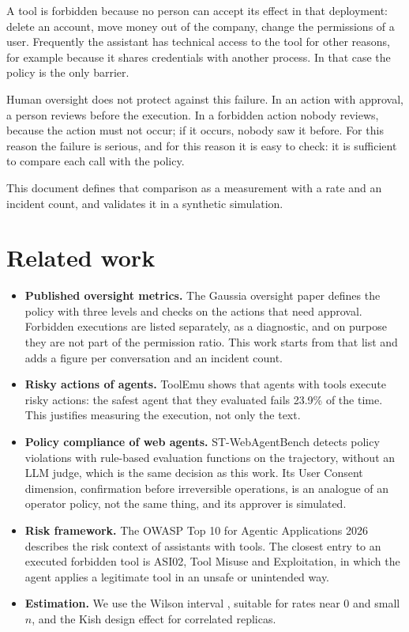 \documentclass[11pt,a4paper]{article}
\begin{document}
A tool is forbidden because no person can accept its effect in that deployment: delete an account, move money out
of the company, change the permissions of a user. Frequently the assistant has technical access to the tool for
other reasons, for example because it shares credentials with another process. In that case the policy is the only
barrier.

Human oversight does not protect against this failure. In an action with approval, a person reviews before the
execution. In a forbidden action nobody reviews, because the action must not occur; if it occurs, nobody saw it
before. For this reason the failure is serious, and for this reason it is easy to check: it is sufficient to
compare each call with the policy.

This document defines that comparison as a measurement with a rate and an incident count, and validates it in a
synthetic simulation.

\section{Related work}

\begin{itemize}
  \item \textbf{Published oversight metrics.} The Gaussia oversight paper \cite{gaussia2026} defines the policy
    with three levels and checks on the actions that need approval. Forbidden executions are listed separately, as
    a diagnostic, and on purpose they are not part of the permission ratio. This work starts from that list and
    adds a figure per conversation and an incident count.
  \item \textbf{Risky actions of agents.} ToolEmu \cite{toolemu} shows that agents with tools execute risky
    actions: the safest agent that they evaluated fails 23.9\% of the time. This justifies measuring the
    execution, not only the text.
  \item \textbf{Policy compliance of web agents.} ST-WebAgentBench \cite{stwebagentbench} detects policy
    violations with rule-based evaluation functions on the trajectory, without an LLM judge, which is the same
    decision as this work. Its User Consent dimension, confirmation before irreversible operations, is an
    analogue of an operator policy, not the same thing, and its approver is simulated.
  \item \textbf{Risk framework.} The OWASP Top 10 for Agentic Applications 2026 \cite{owaspagentic} describes the
    risk context of assistants with tools. The closest entry to an executed forbidden tool is ASI02, Tool Misuse
    and Exploitation, in which the agent applies a legitimate tool in an unsafe or unintended way.
  \item \textbf{Estimation.} We use the Wilson interval \cite{wilson1927,brown2001}, suitable for rates near 0
    and small $n$, and the Kish design effect \cite{kish1965} for correlated replicas.
\end{itemize}
\end{document}
